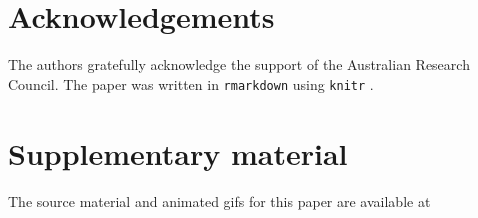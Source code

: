 \documentclass[]{interact}
\theoremstyle{plain}%
\theoremstyle{definition}
\theoremstyle{remark}
\begin{document}
\hypertarget{acknowledgements}{%
\section*{Acknowledgements}\label{acknowledgements}}

The authors gratefully acknowledge the support of the Australian
Research Council. The paper was written in \texttt{rmarkdown}
\citep{rmarkdown} using \texttt{knitr} \citep{knitr}.

\hypertarget{supplementary-material}{%
\section*{Supplementary material}\label{supplementary-material}}

The source material and animated gifs for this paper are available at



\end{document}

